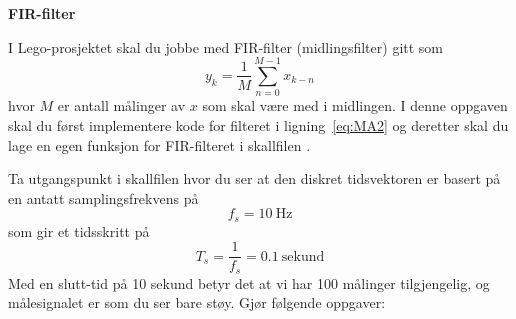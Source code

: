 \item
{\bf FIR-filter}
\label{oppg:i}

I Lego-prosjektet skal du jobbe med 
  FIR-filter (midlingsfilter) gitt som 
\begin{equation}
  \label{eq:MA2}
  y_{k} = \frac{1}{M}\sum_{n=0}^{M-1} x_{k-n}
\end{equation}
hvor $M$ er antall målinger av $x$ som skal være med i midlingen.
I denne oppgaven skal du først implementere kode for filteret i
ligning~\eqref{eq:MA2} og deretter skal du lage en egen
funksjon for FIR-filteret i skallfilen . 

Ta utgangspunkt i skallfilen
hvor du ser at den diskret tidsvektoren
 er basert på en antatt samplingsfrekvens på
  \begin{equation}
    \label{eq:15}
      f_{s} = 10~\text{Hz}
  \end{equation}
  som gir et tidsskritt på
  \begin{equation}
    \label{eq:14}
T_{s} = \frac{1}{f_{s}} = 0.1~\text{sekund}     
  \end{equation}
Med en slutt-tid på 10 sekund  betyr det at vi har 100 målinger
tilgjengelig, og målesignalet  er som du ser bare støy. 
Gjør følgende oppgaver:
